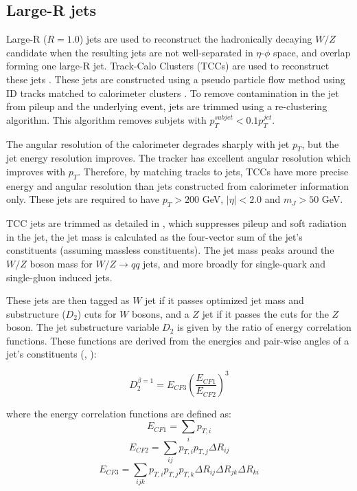 \subsection{Large-R jets}
Large-R ($R = 1.0$) jets are used to reconstruct the hadronically decaying $W/Z$ candidate when the resulting jets are not well-separated in $\eta$-$\phi$ space, and overlap forming one large-R jet. Track-Calo Clusters (TCCs) are used to reconstruct these jets \cite{tcc}. These jets are constructed using a pseudo particle flow method using ID tracks matched to calorimeter clusters \cite{particleflow}. To remove contamination in the jet from pileup and the underlying event, jets are trimmed using a re-clustering algorithm. This algorithm removes subjets with $p_{T}^{subjet} < 0.1p_{T}^{jet}$. 

The angular resolution of the calorimeter degrades sharply with jet $p_{T}$, but the jet energy resolution improves. The tracker has excellent angular resolution which improves with $p_{T}$. Therefore, by matching tracks to jets, TCCs have more precise energy and angular resolution than jets constructed from calorimeter information only. These jets are required to have $p_{T}>200$ GeV, $|\eta| < 2.0$ and $m_{J} > 50$ GeV. 

TCC jets are trimmed as detailed in \cite{jet_trimming}, which suppresses pileup and soft radiation in the jet, the jet mass is calculated as the four-vector sum of the jet's constituents (assuming massless constituents). The jet mass peaks around the $W/Z$ boson mass for $W/Z \rightarrow qq$ jets, and more broadly for single-quark and single-gluon induced jets. 

These jets are then tagged as $W$ jet if it passes optimized jet mass and substructure ($D_{2}$) cuts for $W$ bosons, and a $Z$ jet if it passes the cuts for the $Z$ boson. The jet substructure variable $D_{2}$ is given by the ratio of energy correlation functions. These functions are derived from the energies and pair-wise angles of a jet's constituents (\cite{jet_observables}, \cite{boosted_boson}):

\begin{equation}
D_{2}^{\beta=1} = E_{CF3}\left(\frac{E_{CF1}}{E_{CF2}}\right)^{3}
\end{equation}

where the energy correlation functions are defined as:
\begin{equation}
E_{CF1}=\sum_{i}p_{T,i}
\end{equation}
\begin{equation}
E_{CF2}=\sum_{ij}p_{T,i}p_{T,j}\Delta R_{ij}
\end{equation}
\begin{equation}
E_{CF3}=\sum_{ijk}p_{T,i}p_{T,j}p_{T,k}\Delta R_{ij}\Delta R_{jk}\Delta R_{ki}
\end{equation}

